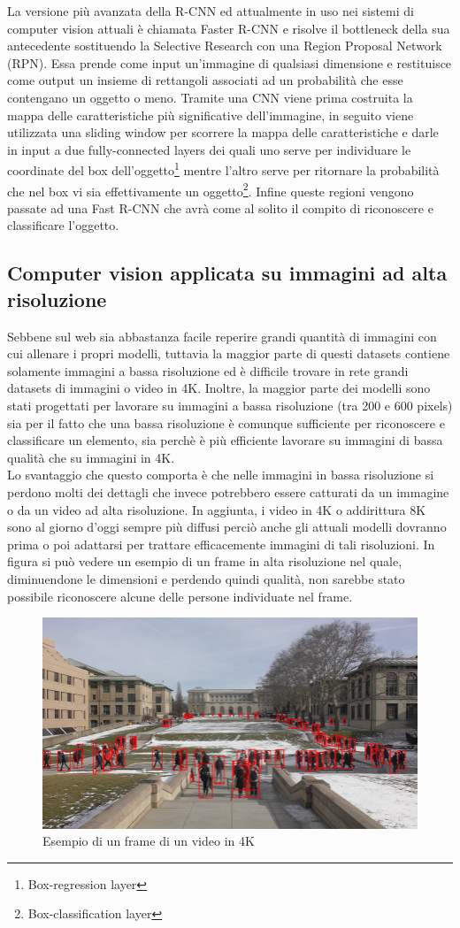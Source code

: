 La versione più avanzata della R-CNN ed attualmente in uso nei sistemi di computer vision attuali è chiamata Faster R-CNN e risolve il bottleneck della sua antecedente sostituendo la Selective Research con una Region Proposal Network (RPN). Essa prende come input un'immagine di qualsiasi dimensione e restituisce come output un insieme di rettangoli associati ad un probabilità che esse contengano un oggetto o meno. Tramite una CNN viene prima costruita la mappa delle caratteristiche più significative dell'immagine, in seguito viene utilizzata una sliding window per scorrere la mappa delle caratteristiche e darle in input a due fully-connected layers dei quali uno serve per individuare le coordinate del box dell'oggetto\footnote{Box-regression layer} mentre l'altro serve per ritornare la probabilità che nel box vi sia effettivamente un oggetto\footnote{Box-classification layer}. Infine queste regioni vengono passate ad una Fast R-CNN che avrà come al solito il compito di riconoscere e classificare l'oggetto.
\subsection{Computer vision applicata su immagini ad alta risoluzione}
Sebbene sul web sia abbastanza facile reperire grandi quantità di immagini con cui allenare i propri modelli, tuttavia la maggior parte di questi datasets contiene solamente immagini a bassa risoluzione ed è difficile trovare in rete grandi datasets di immagini o video in 4K. Inoltre, la maggior parte dei modelli sono stati progettati per lavorare su immagini a bassa risoluzione (tra 200 e 600 pixels) sia per il fatto che una bassa risoluzione è comunque sufficiente per riconoscere e classificare un elemento, sia perchè è più efficiente lavorare su immagini di bassa qualità che su immagini in 4K.\\
Lo svantaggio che questo comporta è che nelle immagini in bassa risoluzione si perdono molti dei dettagli che invece potrebbero essere catturati da un immagine o da un video ad alta risoluzione. In aggiunta, i video in 4K o addirittura 8K sono al giorno d'oggi sempre più diffusi perciò anche gli attuali modelli dovranno prima o poi adattarsi per trattare efficacemente immagini di tali risoluzioni. In figura si può vedere un esempio di un frame in alta risoluzione nel quale, diminuendone le dimensioni e perdendo quindi qualità, non sarebbe stato possibile riconoscere alcune delle persone individuate nel frame.
\begin{figure}[H]
	\centering
	\includegraphics[width=0.7\linewidth]{images/Esempio-4K-video-frame.png}
	\caption{Esempio di un frame di un video in 4K}
	\label{Esempio di un frame di un video in 4K}
\end{figure}
